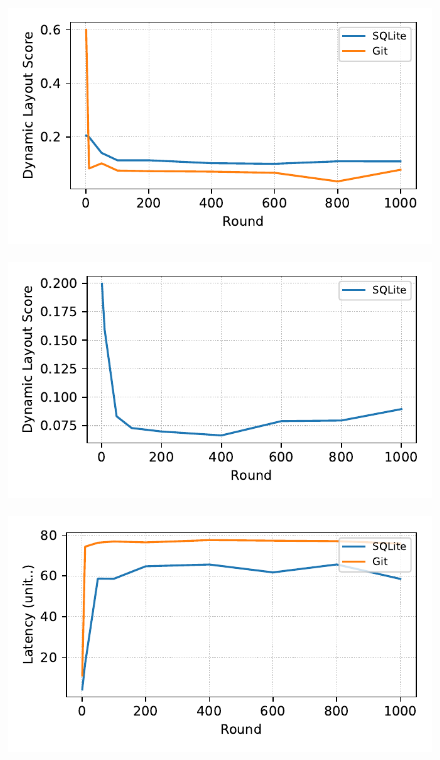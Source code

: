 \begin{figure}[t]
    \centering
    \includegraphics[width=0.95\columnwidth]{graphs/py_graph/dynamic}
    \caption{}
    \label{f:dynamic}
\end{figure}

\begin{figure}[t]
    \centering
    \includegraphics[width=0.95\columnwidth]{graphs/py_graph/dynamic-f2fs}
    \caption{}
    \label{f:f2fs_dynamic_score}
\end{figure}


\begin{figure}[t]
    \centering
    \includegraphics[width=0.95\columnwidth]{graphs/py_graph/latency}
    \caption{}
    \label{f:latency}
\end{figure}

